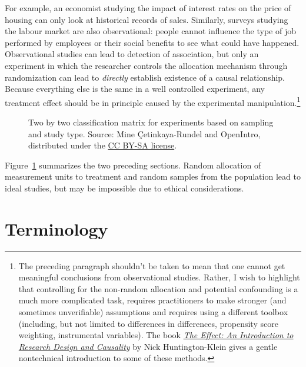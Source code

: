 \documentclass[
  11pt,
  letterpaper,
]{scrbook}
\theoremstyle{definition}
\theoremstyle{definition}
\theoremstyle{remark}
\begin{document}
For example, an economist studying the impact of interest rates on the
price of housing can only look at historical records of sales.
Similarly, surveys studying the labour market are also observational:
people cannot influence the type of job performed by employees or their
social benefits to see what could have happened. Observational studies
can lead to detection of association, but only an experiment in which
the researcher controls the allocation mechanism through randomization
can lead to \emph{directly} establish existence of a causal
relationship. Because everything else is the same in a well controlled
experiment, any treatment effect should be in principle caused by the
experimental manipulation.\footnote{The preceding paragraph shouldn't be
  taken to mean that one cannot get meaningful conclusions from
  observational studies. Rather, I wish to highlight that controlling
  for the non-random allocation and potential confounding is a much more
  complicated task, requires practitioners to make stronger (and
  sometimes unverifiable) assumptions and requires using a different
  toolbox (including, but not limited to differences in differences,
  propensity score weighting, instrumental variables). The book
  \href{https://theeffectbook.net/index.html}{\emph{The Effect: An
  Introduction to Research Design and Causality}} by Nick
  Huntington-Klein gives a gentle nontechnical introduction to some of
  these methods.}

\begin{figure}[ht!]


\caption{\label{fig-openintrograph}Two by two classification matrix for
experiments based on sampling and study type. Source: Mine
Çetinkaya-Rundel and OpenIntro, distributed under the
\href{https://creativecommons.org/licenses/by-sa/3.0/us/}{CC BY-SA
license}.}

\end{figure}%

Figure~\ref{fig-openintrograph} summarizes the two preceding sections.
Random allocation of measurement units to treatment and random samples
from the population lead to ideal studies, but may be impossible due to
ethical considerations.

\section{Terminology}\label{terminology}
\end{document}
